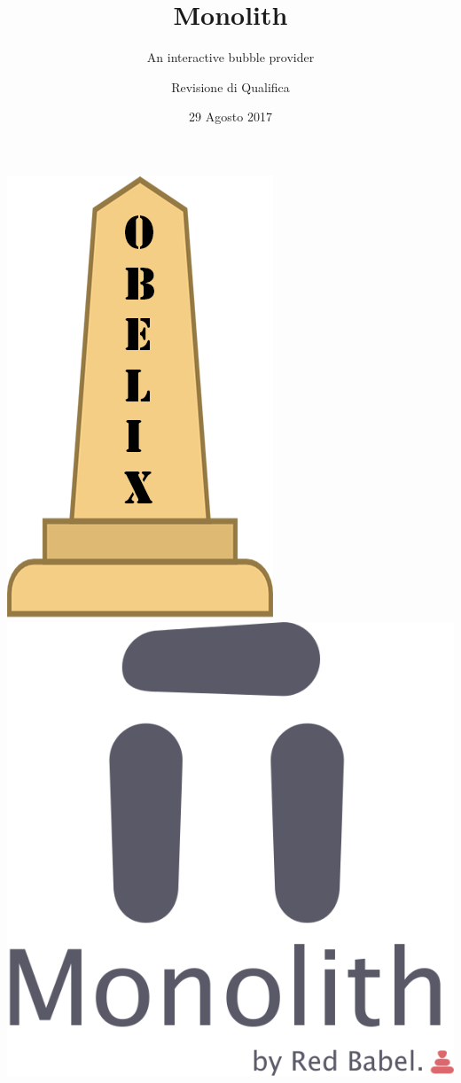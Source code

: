 \documentclass[RawSienna,dvipsnames]{beamer}
\title{Monolith}
\subtitle{An interactive bubble provider}
\author{Revisione di Qualifica}
\date{29 Agosto 2017}
\begin{document}
	
\begin{frame}
	\begin{center}
		\includegraphics[scale=0.13]{img/obelix.png}
		\qquad\qquad
		\includegraphics[scale=0.13]{img/monolith.png}
	\end{center}
	\titlepage
\end{frame}
\end{document}
